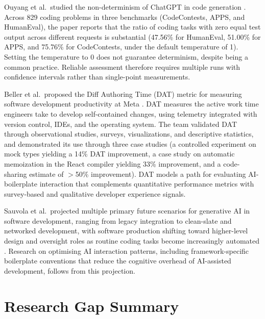 \documentclass[12pt,a4paper]{report}
\begin{document}
Ouyang et al.\ studied the non-determinism of ChatGPT in code generation \parencite{ouyang2025nondeterminism}. Across 829 coding problems in three benchmarks (CodeContests, APPS, and HumanEval), the paper reports that the ratio of coding tasks with zero equal test output across different requests is substantial (47.56\% for HumanEval, 51.00\% for APPS, and 75.76\% for CodeContests, under the default temperature of 1). Setting the temperature to 0 does not guarantee determinism, despite being a common practice. Reliable assessment therefore requires multiple runs with confidence intervals rather than single-point measurements.

Beller et al.\ proposed the Diff Authoring Time (DAT) metric for measuring software development productivity at Meta \parencite{beller2025dat}. DAT measures the active work time engineers take to develop self-contained changes, using telemetry integrated with version control, IDEs, and the operating system. The team validated DAT through observational studies, surveys, visualizations, and descriptive statistics, and demonstrated its use through three case studies (a controlled experiment on mock types yielding a 14\% DAT improvement, a case study on automatic memoization in the React compiler yielding 33\% improvement, and a code-sharing estimate of $>$50\% improvement). DAT models a path for evaluating AI-boilerplate interaction that complements quantitative performance metrics with survey-based and qualitative developer experience signals.

Sauvola et al.\ projected multiple primary future scenarios for generative AI in software development, ranging from legacy integration to clean-slate and networked development, with software production shifting toward higher-level design and oversight roles as routine coding tasks become increasingly automated \parencite{sauvola2024future}. Research on optimising AI interaction patterns, including framework-specific boilerplate conventions that reduce the cognitive overhead of AI-assisted development, follows from this projection.

\section{Research Gap Summary}
\end{document}
